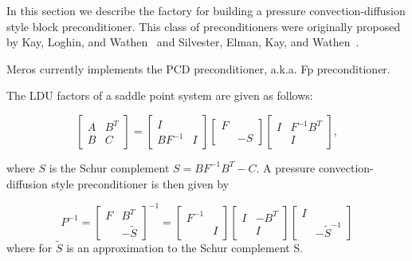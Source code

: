 In this section we describe the factory for building a pressure
convection-diffusion style block preconditioner. This class of
preconditioners were originally proposed by Kay, Loghin, and
Wathen~\cite{KayLoghinWathen} and Silvester, Elman, Kay, and
Wathen~\cite{SilvesterElmanKayWathen}.

Meros currently implements the PCD preconditioner, a.k.a. Fp
preconditioner. 

The LDU factors of a saddle point system are given as follows:

\begin{equation}
  \left[ \begin{array}{cc} A & B^T \\ B & C \end{array} \right]
     = \left[ \begin{array}{cc} I & \\ BF^{-1} & I \end{array} \right]
       \left[ \begin{array}{cc} F & \\  & -S \end{array} \right]
       \left[ \begin{array}{cc} I & F^{-1} B^T  \\  & I \end{array} \right],
\end{equation}

where $S$ is the Schur complement $S = B F^{-1} B^T - C$.  A
pressure convection-diffusion style preconditioner is then given by

\begin{equation}
  P^{-1} =
       \left[ \begin{array}{cc} F & B^T \\ & -\tilde S \end{array} \right]^{-1}
       = 
       \left[ \begin{array}{cc} F^{-1} &  \\  & I \end{array} \right]
       \left[ \begin{array}{cc} I & -B^T \\  & I \end{array} \right]
       \left[ \begin{array}{cc} I &  \\  & -\tilde S^{-1} \end{array} \right]
\end{equation}
where for $\tilde S$ is an approximation to the Schur complement S.

